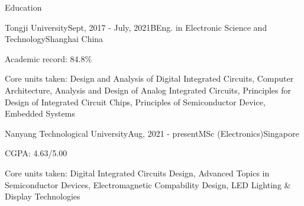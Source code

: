 \documentclass{resume} %
\begin{document}

\begin{rSection}{Education}
	
	\begin{rSubsection}{Tongji University}{Sept, 2017 - July, 2021}{BEng. in Electronic Science and Technology}{Shanghai China}
		\item Academic record: 84.8\% 
		\item Core units taken: Design and Analysis of Digital Integrated Circuits, Computer Architecture, Analysis and Design of Analog Integrated Circuits, Principles for Design of Integrated Circuit Chips, Principles of Semiconductor Device, Embedded Systems
	\end{rSubsection}

	\begin{rSubsection}{Nanyang Technological University}{Aug, 2021 - present}{MSc (Electronics)}{Singapore}
		\item CGPA: 4.63/5.00
		\item Core units taken: Digital Integrated Circuits Design, Advanced Topics in Semiconductor Devices, Electromagnetic Compability Design, LED Lighting \& Display Technologies
	\end{rSubsection}

\end{rSection}
\end{document}
